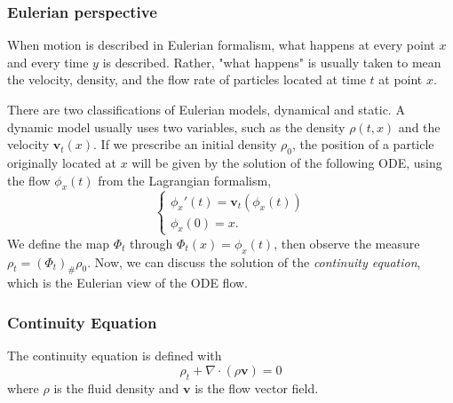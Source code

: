 \documentclass[12pt]{article}
\theoremstyle{plain}
\numberwithin{equation}{section}
\begin{document}
\subsubsection{Eulerian perspective}
When motion is described in Eulerian formalism, what happens at every point $x$ and every time $y$ is described. Rather, "what happens" is usually taken to mean the velocity, density, and the flow rate of particles located at time $t$ at point $x$.

There are two classifications of Eulerian models, dynamical and static. A dynamic model usually uses two variables, such as the density $\rho(t,x)$ and the velocity $\mathbf{v}_t(x)$. If we prescribe an initial density $\rho_0$, the position of a particle originally located at $x$ will be given by the solution of the following ODE, using the flow $\phi_x(t)$ from the Lagrangian formalism,
\begin{equation*}
  \begin{cases}
    \phi_x'(t) = \mathbf{v}_t(\phi_x(t)) \\
    \phi_x(0) = x.
  \end{cases}
\end{equation*}
We define the map $\Phi_t$ through $\Phi_t(x) = \phi_x(t)$, then observe the measure $\rho_t = (\Phi_t)_\#\rho_0$. Now, we can discuss the solution of the \textit{continuity equation}, which is the Eulerian view of the ODE flow.
\subsubsection{Continuity Equation}
The continuity equation is defined with 
\begin{equation}\label{eqn:continuity}\rho_t + \nabla \cdot (\rho\mathbf{v}) = 0\end{equation}
where $\rho$ is the fluid density and $\mathbf{v}$ is the flow vector field.
\end{document}
